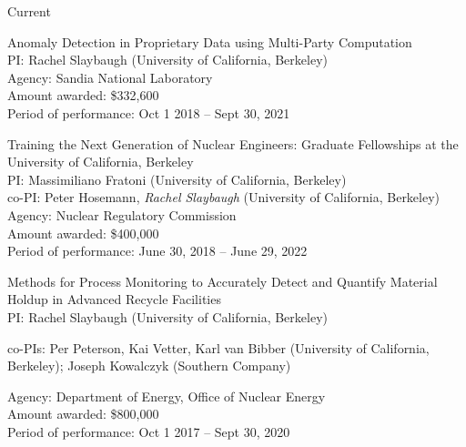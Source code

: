 \begin{rSubsection}{Current}{}{}{}
\item Anomaly Detection in Proprietary Data using Multi-Party Computation	\\
PI: Rachel Slaybaugh (University of California, Berkeley) \\
Agency: Sandia National Laboratory \\
Amount awarded: \$332,600\\
Period of performance: Oct 1 2018 -- Sept 30, 2021\\

\vspace*{0.3 em}
\item Training the Next Generation of Nuclear Engineers: Graduate Fellowships at the University of California, Berkeley	\\
PI: Massimiliano Fratoni (University of California, Berkeley) \\
\hspace*{1 em} co-PI: Peter Hosemann, \textit{Rachel Slaybaugh} (University of California, Berkeley)\\
Agency: Nuclear Regulatory Commission \\
Amount awarded: \$400,000\\
Period of performance: June 30, 2018 -- June 29, 2022

\vspace*{0.3 em}
\item Methods for Process Monitoring to Accurately Detect and Quantify Material Holdup in Advanced Recycle Facilities	\\
PI: Rachel Slaybaugh (University of California, Berkeley)
\vspace*{-.6 em}
\begin{addmargin}[1em]{0 em}
co-PIs:  Per Peterson, Kai Vetter, Karl van Bibber (University of California, Berkeley); Joseph Kowalczyk (Southern Company)
\end{addmargin}
\vspace*{-.6 em}
Agency: Department of Energy, Office of Nuclear Energy \\
Amount awarded: \$800,000\\
Period of performance: Oct 1 2017 -- Sept 30, 2020


\end{rSubsection}
